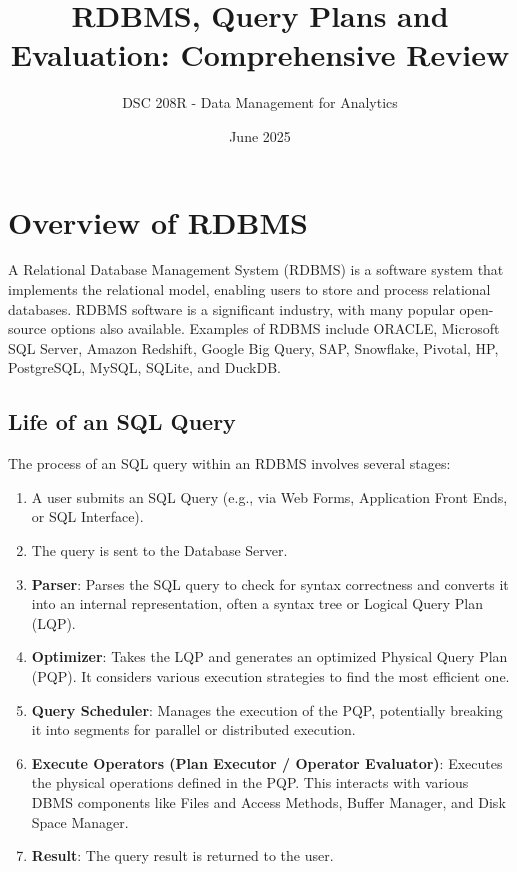 \documentclass{article}
\title{RDBMS, Query Plans and Evaluation: Comprehensive Review}
\author{DSC 208R - Data Management for Analytics}
\date{June 2025}
\begin{document}
\maketitle

\section*{Overview of RDBMS}
A Relational Database Management System (RDBMS) is a software system that implements the relational model, enabling users to store and process relational databases. RDBMS software is a significant industry, with many popular open-source options also available. Examples of RDBMS include ORACLE, Microsoft SQL Server, Amazon Redshift, Google Big Query, SAP, Snowflake, Pivotal, HP, PostgreSQL, MySQL, SQLite, and DuckDB.

\subsection*{Life of an SQL Query}
The process of an SQL query within an RDBMS involves several stages:
\begin{enumerate}
    \item A user submits an SQL Query (e.g., via Web Forms, Application Front Ends, or SQL Interface).
    \item The query is sent to the Database Server.
    \item \textbf{Parser}: Parses the SQL query to check for syntax correctness and converts it into an internal representation, often a syntax tree or Logical Query Plan (LQP).
    \item \textbf{Optimizer}: Takes the LQP and generates an optimized Physical Query Plan (PQP). It considers various execution strategies to find the most efficient one.
    \item \textbf{Query Scheduler}: Manages the execution of the PQP, potentially breaking it into segments for parallel or distributed execution.
    \item \textbf{Execute Operators (Plan Executor / Operator Evaluator)}: Executes the physical operations defined in the PQP. This interacts with various DBMS components like Files and Access Methods, Buffer Manager, and Disk Space Manager.
    \item \textbf{Result}: The query result is returned to the user.
\end{enumerate}
\end{document}
